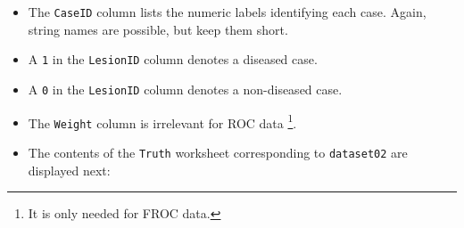 \documentclass[]{book}
\providecommand{\tightlist}{%
  \setlength{\itemsep}{0pt}\setlength{\parskip}{0pt}}
\let\rmarkdownfootnote\footnote%
\def\footnote{\protect\rmarkdownfootnote}
\begin{document}
\begin{itemize}
\tightlist
\item
  The \texttt{CaseID} column lists the numeric labels identifying each case. Again, string names are possible, but keep them short.
\item
  A \texttt{1} in the \texttt{LesionID} column denotes a diseased case.
\item
  A \texttt{0} in the \texttt{LesionID} column denotes a non-diseased case.
\item
  The \texttt{Weight} column is irrelevant for ROC data \footnote{It is only needed for FROC data.}.
\item
  The contents of the \texttt{Truth} worksheet corresponding to \texttt{dataset02} are displayed next:
\end{itemize}
\end{document}

